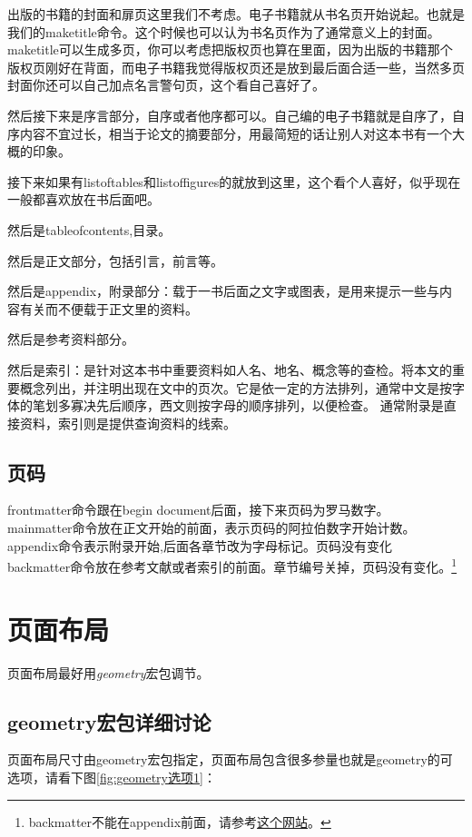 \documentclass[11pt,oneside]{book}
\begin{document}
\begin{common-format}
出版的书籍的封面和扉页这里我们不考虑。电子书籍就从书名页开始说起。也就是我们的maketitle命令。这个时候也可以认为书名页作为了通常意义上的封面。maketitle可以生成多页，你可以考虑把版权页也算在里面，因为出版的书籍那个版权页刚好在背面，而电子书籍我觉得版权页还是放到最后面合适一些，当然多页封面你还可以自己加点名言警句页，这个看自己喜好了。

然后接下来是序言部分，自序或者他序都可以。自己编的电子书籍就是自序了，自序内容不宜过长，相当于论文的摘要部分，用最简短的话让别人对这本书有一个大概的印象。

接下来如果有listoftables和listoffigures的就放到这里，这个看个人喜好，似乎现在一般都喜欢放在书后面吧。

然后是tableofcontents,目录。

然后是正文部分，包括引言，前言等。

然后是appendix，附录部分：载于一书后面之文字或图表，是用来提示一些与内容有关而不便载于正文里的资料。

然后是参考资料部分。

然后是索引：是针对这本书中重要资料如人名、地名、概念等的查检。将本文的重要概念列出，并注明出现在文中的页次。它是依一定的方法排列，通常中文是按字体的笔划多寡决先后顺序，西文则按字母的顺序排列，以便检查。 通常附录是直接资料，索引则是提供查询资料的线索。


\subsection{页码}
\label{sec:页码}
frontmatter命令跟在begin document后面，接下来页码为罗马数字。\\
mainmatter命令放在正文开始的前面，表示页码的阿拉伯数字开始计数。\\ 
appendix命令表示附录开始,后面各章节改为字母标记。页码没有变化\\
backmatter命令放在参考文献或者索引的前面。章节编号关掉，页码没有变化。\footnote{backmatter不能在appendix前面，请参考\href{http://tex.stackexchange.com/questions/20538/what-is-the-right-order-when-using-frontmatter-tableofcontents-mainmatter}{这个网站}。}


\section{页面布局}
页面布局最好用\emph{geometry}宏包调节。

\subsection{geometry宏包详细讨论}
页面布局尺寸由geometry宏包指定，页面布局包含很多参量也就是geometry的可选项，请看下图\ref{fig:geometry选项1}：


\end{common-format}
\end{document}
